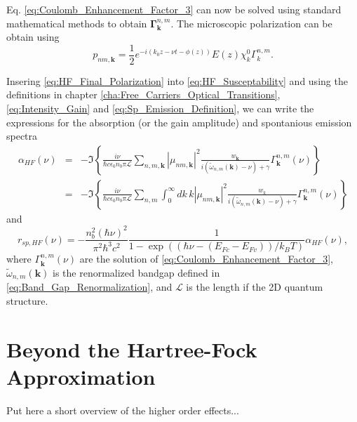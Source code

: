 Eq. \ref{eq:Coulomb_Enhancement_Factor_3} can now be solved using
standard mathematical methods to obtain $\mathbf{\boldsymbol{\Gamma}}_{\mathbf{k}}^{n,m}$.
The microscopic polarization can be obtain using \begin{equation}
p_{nm,\mathbf{k}}=\frac{1}{2}e^{-i\left(k_{0}z-\nu t-\phi(z)\right)}E(z)\chi_{k}^{0}\Gamma_{k}^{n,m}.\label{eq:HF_Final_Polarization}\end{equation}


Insering \ref{eq:HF_Final_Polarization} into \ref{eq:HF_Susceptability}
and using the definitions in chapter \ref{cha:Free_Carriers_Optical_Transitions},
\ref{eq:Intensity_Gain} and \ref{eq:Sp_Emission_Definition}, we
can write the expressions for the absorption (or the gain amplitude)
and spontanious emission spectra\begin{eqnarray}
\alpha_{HF}(\nu) & = & -\Im\left\{ \frac{i\nu}{\hbar c\epsilon_{0}n_{b}\pi\mathcal{L}}\sum_{n,m,\mathbf{k}}\left|\mu_{nm,\mathbf{k}}\right|^{2}\frac{w_{\mathbf{k}}}{i\left(\tilde{\omega}_{n,m}(\mathbf{k})-\nu\right)+\gamma}\Gamma_{\mathbf{k}}^{n,m}(\nu)\right\} \nonumber \\
 & = & -\Im\left\{ \frac{i\nu}{\hbar c\epsilon_{0}n_{b}\pi\mathcal{L}}\sum_{n,m}\int_{0}^{\infty}dk\, k\left|\mu_{nm,\mathbf{k}}\right|^{2}\frac{w_{k}}{i\left(\tilde{\omega}_{n,m}(\mathbf{k})-\nu\right)+\gamma}\Gamma_{\mathbf{k}}^{n,m}(\nu)\right\} \label{eq:HF_Absorption}\end{eqnarray}
and \begin{equation}
r_{sp,HF}(\nu)=-\frac{n_{b}^{2}(\hbar\nu)^{2}}{\pi^{2}\hbar^{3}c^{2}}\frac{1}{1-\exp\left(\left(\hbar\nu-\left(E_{Fc}-E_{Fv}\right)\right)/k_{B}T\right)}\alpha_{HF}(\nu),\label{eq:HF_Sp_Emission}\end{equation}
where $\Gamma_{\mathbf{k}}^{n,m}(\nu)$ are the solution of \ref{eq:Coulomb_Enhancement_Factor_3},
$\tilde{\omega}_{n,m}(\mathbf{k})$ is the renormalized bandgap defined
in \ref{eq:Band_Gap_Renormalization}, and $\mathcal{L}$ is the length
if the 2D quantum structure. 


\section{Beyond the Hartree-Fock Approximation}

%
\begin{lyxgreyedout}
Put here a short overview of the higher order effects...
\end{lyxgreyedout}

